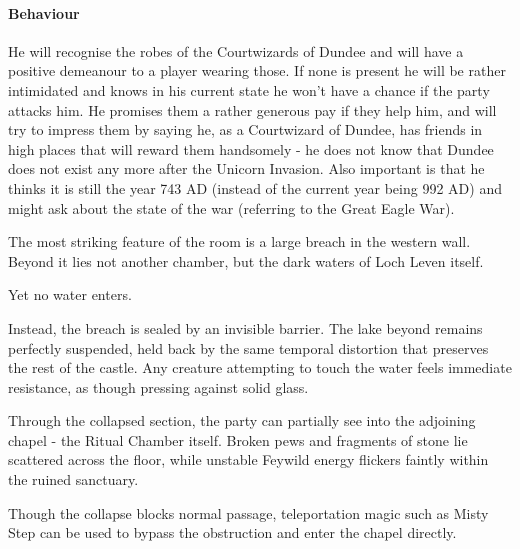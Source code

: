 {\paragraph*{Behaviour} He will recognise the robes of the Courtwizards of Dundee and will have a positive demeanour to a player wearing those. If none is present he will be rather intimidated and knows in his current state he won't have a chance if the party attacks him. He promises them a rather generous pay if they help him, and will try to impress them by saying he, as a Courtwizard of Dundee, has friends in high places that will reward them handsomely - he does not know that Dundee does not exist any more after the Unicorn Invasion. Also important is that he thinks it is still the year 743 AD (instead of the current year being 992 AD) and might ask about the state of the war (referring to the Great Eagle War).}
\vfill\eject
{\noindent\entryfont The most striking feature of the room is a large breach in the western wall. Beyond it lies not another chamber, but the dark waters of Loch Leven itself.

Yet no water enters.

Instead, the breach is sealed by an invisible barrier. The lake beyond remains perfectly suspended, held back by the same temporal distortion that preserves the rest of the castle. Any creature attempting to touch the water feels immediate resistance, as though pressing against solid glass.

Through the collapsed section, the party can partially see into the adjoining chapel - the Ritual Chamber itself. Broken pews and fragments of stone lie scattered across the floor, while unstable Feywild energy flickers faintly within the ruined sanctuary.

Though the collapse blocks normal passage, teleportation magic such as Misty Step can be used to bypass the obstruction and enter the chapel directly.}

